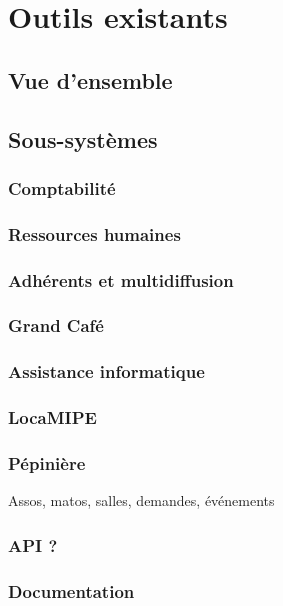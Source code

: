 \section{Outils existants}
\subsection{Vue d'ensemble}
\subsection{Sous-systèmes}
\subsubsection{Comptabilité}
\subsubsection{Ressources humaines}
\subsubsection{Adhérents et multidiffusion}
\subsubsection{Grand Café}
\subsubsection{Assistance informatique}
\subsubsection{LocaMIPE}
\subsubsection{Pépinière}
Assos, matos, salles, demandes, événements
\subsubsection{API ?}
\subsubsection{Documentation}